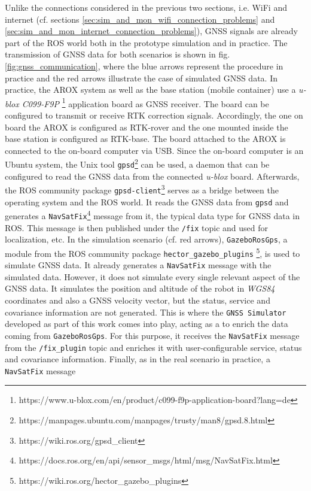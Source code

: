 \documentclass[english, master, utf8]{base/thesis_KBS}
\newcommand{\code}[1]{\colorbox{light-gray}{\texttt{#1}}}
\begin{document}
Unlike the connections considered in the previous two sections, i.e. WiFi and internet (cf. sections \ref{sec:sim_and_mon_wifi_connection_problems} and
\ref{sec:sim_and_mon_internet_connection_problems}), GNSS signals are already part of the ROS world both in the prototype simulation and in practice. The transmission of GNSS data
for both scenarios is shown in fig. \ref{fig:gnss_communication}, where the blue arrows represent the procedure in practice and the red arrows illustrate the case of simulated GNSS
data. In practice, the AROX system as well as the base station (mobile container) use a \textit{u-blox C099-F9P}
\footnote{https://www.u-blox.com/en/product/c099-f9p-application-board?lang=de} application board as GNSS receiver. The board can be configured to transmit or receive RTK correction
signals. Accordingly, the one on board the AROX is configured as RTK-rover and the one mounted inside the base station is configured as RTK-base. The board attached to the AROX is
connected to the on-board computer via USB. Since the on-board computer is an Ubuntu system, the Unix tool
\code{gpsd}\footnote{https://manpages.ubuntu.com/manpages/trusty/man8/gpsd.8.html} can be used, a daemon that can be configured to read the GNSS data from the connected
\textit{u-blox} board. Afterwards, the ROS community package \code{gpsd-client}\footnote{https://wiki.ros.org/gpsd\_client} serves as a bridge between the operating system and the
ROS world. It reads the GNSS data from \code{gpsd} and generates a \code{NavSatFix}\footnote{https://docs.ros.org/en/api/sensor\_msgs/html/msg/NavSatFix.html} message from it, the typical data type for GNSS data in ROS. This message is then published under
the \code{/fix} topic and used for localization, etc. In the simulation scenario (cf. red arrows), \code{GazeboRosGps}, a module from the ROS community package
\code{hector\_gazebo\_plugins} \footnote{https://wiki.ros.org/hector\_gazebo\_plugins}, is used to simulate GNSS data. It already generates a \code{NavSatFix} message with the
simulated data. However, it does not simulate every single relevant aspect of the GNSS data. It simulates the position and altitude of the robot in \textit{WGS84} coordinates and
also a GNSS velocity vector, but the status, service and covariance information are not generated. This is where the \code{GNSS Simulator} developed as part of this work comes
into play, acting as a  to enrich the data coming from \code{GazeboRosGps}. For this purpose, it receives the \code{NavSatFix} message from the
\code{/fix\_plugin} topic and enriches it with user-configurable service, status and covariance information. Finally, as in the real scenario in practice, a \code{NavSatFix} message
\end{document}

